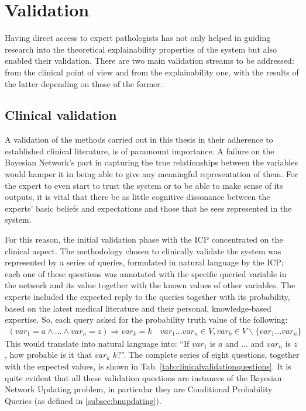 \section{Validation} \label{sec:validation}
Having direct access to expert pathologists has not only helped in guiding research into the theoretical explainability properties of the system but also enabled their validation.
There are two main validation streams to be addressed: from the clinical point of view and from the explainability one, with the results of the latter depending on those of the former.
 
\subsection{Clinical validation} \label{subsec:clinical-validation-methodology}
A validation of the methods carried out in this thesis in their adherence to established clinical literature, is of paramount importance.
A failure on the Bayesian Network's part in capturing the true relationships between the variables would hamper it in being able to give any meaningful representation of them.
For the expert to even start to trust the system or to be able to make sense of its outputs, it is vital that there be as little cognitive dissonance between the experts' basic beliefs and expectations and those that he sees represented in the system.

For this reason, the initial validation phase with the ICP concentrated on the clinical aspect.
The methodology chosen to clinically validate the system was represented by a series of queries, formulated in natural language by the ICP; each one of these questions was annotated with the specific queried variable in the network and its value together with the known values of other variables.
The experts included the expected reply to the queries together with its probability, based on the latest medical literature and their personal, knowledge-based expertise.
So, each query asked for the probability truth value of the following:
\begin{align}
	(var_1 = a \wedge \ldots \wedge var_n = z ) \Rightarrow var_k = k \quad var_1 \ldots var_n \in V, var_k \in V \smallsetminus \{ var_1 \ldots var_n \}
\end{align}
This would translate into natural language into:
\enquote{If $var_1$ is $a$ and $\ldots$ and $var_n$ is $z$, how probable is it that $var_k$ $k$?}.
The complete series of eight questions, together with the expected values, is shown in Tab. \ref{tab:clinicalvalidationquestions}.
It is quite evident that all these validation questions are instances of the Bayesian Network Updating problem, in particular they are Conditional Probability Queries (as defined in \ref{subsec:bnupdating}).

